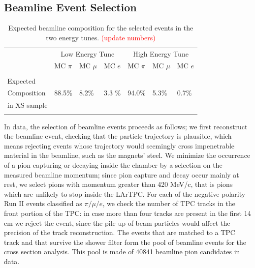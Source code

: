\documentclass[aps,prl,twocolumn,showpacs,superscriptaddress,groupedaddress]{revtex4}  %
\begin{document}
\subsection{\label{sec:EventSelection}Beamline Event Selection}
\begin{table}
\caption{\label{tab:MCafterCutContaminants}Expected beamline composition for the selected events in the two energy tunes. \textcolor{red}{(update numbers)}}
\begin{ruledtabular}
\begin{tabular}{ l | l | l | l | l | l | l  |}
 &  \multicolumn{3}{c|}{Low Energy Tune} & \multicolumn{3}{c|}{High Energy Tune }\\
& MC $\pi$   & MC  $ \mu$ & MC  $e$ & MC  $\pi$ & MC  $\mu$ & MC  $e$  \\
\hline
&  &  &  & & &\\  
Expected &  &  &  & & &\\  
Composition&  88.5\%   & 8.2\%   & 3.3 \%   & 94.0\%	& 5.3\% & 0.7\%\\
in XS sample               &                      &                       &                   &                       &                        &\\  
&                      &                       &                   &                       &                        &\\  
\end{tabular}
\end{ruledtabular}
\end{table}

In data, the selection of beamline events proceeds as follows; we first reconstruct the beamline event, checking that the particle trajectory is plausible, which means rejecting events whose trajectory would seemingly  cross impenetrable material in the beamline, such as the magnets' steel. We minimize the occurrence of a pion capturing or decaying inside the chamber by a selection on the measured  beamline momentum; since pion capture and decay occur mainly at rest,  we select pions with momentum greater than 420 MeV/c, that is pions which are unlikely to stop inside the LArTPC.
For each of the negative polarity Run II events classified as $\pi/\mu/e$, we check the number of TPC tracks in the front portion of the TPC: in case more than four tracks are present in the first 14 cm we reject the event,  since the pile up of beam particles would affect the precision of the track reconstruction. The events that are matched to a TPC track and that survive the shower filter form the pool of beamline events for the cross section analysis. This pool is made of 40841 beamline pion candidates in data. 
\end{document}
